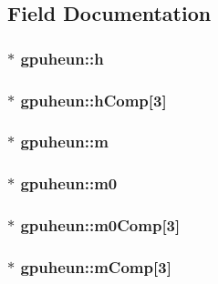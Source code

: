 \subsection{Field Documentation}
\hypertarget{structgpuheun_a46f8656e846de7e3db0842175856eb78}{
\subsubsection[{h}]{$\ast$ {\bf gpuheun::h}}}
\label{structgpuheun_a46f8656e846de7e3db0842175856eb78}
\hypertarget{structgpuheun_ad4952751eccd1d1e38a37f44f4abf933}{
\subsubsection[{hComp}]{$\ast$ {\bf gpuheun::hComp}\mbox{[}3\mbox{]}}}
\label{structgpuheun_ad4952751eccd1d1e38a37f44f4abf933}
\hypertarget{structgpuheun_ad6a8fd6913184306f6ba1a1a04c25f6d}{
\subsubsection[{m}]{$\ast$ {\bf gpuheun::m}}}
\label{structgpuheun_ad6a8fd6913184306f6ba1a1a04c25f6d}
\hypertarget{structgpuheun_a29f07e020e3726b0e0a969c0054bb72d}{
\subsubsection[{m0}]{$\ast$ {\bf gpuheun::m0}}}
\label{structgpuheun_a29f07e020e3726b0e0a969c0054bb72d}
\hypertarget{structgpuheun_a38d1d5b9d0f834be7803288efc029960}{
\subsubsection[{m0Comp}]{$\ast$ {\bf gpuheun::m0Comp}\mbox{[}3\mbox{]}}}
\label{structgpuheun_a38d1d5b9d0f834be7803288efc029960}
\hypertarget{structgpuheun_aeee03bc1018dae008c269f1ada8185e6}{
\subsubsection[{mComp}]{$\ast$ {\bf gpuheun::mComp}\mbox{[}3\mbox{]}}}

